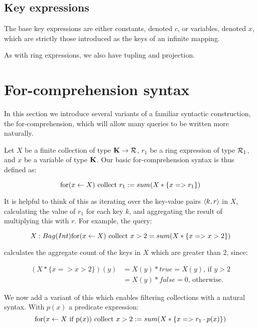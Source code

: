 {{{}

\subsection{Key expressions} {

The base key expressions are either constants, denoted $c$, or variables, denoted $x$, which are strictly those introduced as the keys of an infinite mapping.

As with ring expressions, we also have tupling and projection. 
}


\section{For-comprehension syntax} {
In this section we introduce several variants of a familiar syntactic construction, the for-comprehension, which will allow many queries to be written more naturally.

Let $X$ be a finite collection of type $\mathbf{K} \rightarrow \mathcal{R}$, $r_1$ be a ring expression of type $\mathcal{R}_1$, and $x$ be a variable of type $\mathbf{K}$. Our basic for-comprehension syntax is thus defined as:

\begin{equation*}
 \textrm{for}(x \leftarrow X) \textrm{ collect } r_1 := sum(X * \{x => r_1\})
 \end{equation*}
 
 It is helpful to think of this as iterating over the key-value pairs $\langle k, r \rangle$ in $X$, calculating the value of $r_1$ for each key $k$, and aggregating the result of multiplying this with $r$. For example, the query:

\begin{equation*} 
X : Bag(Int) \\
 \textrm{for}(x \leftarrow X) \textrm{ collect } x > 2 = sum(X * \{x => x > 2\})
\end{equation*}

calculates the aggregate count of the keys in $X$ which are greater than 2, since:

\begin{equation*}
\begin{split}
(X*\{x => x > 2\})(y) &= X(y)*true = X(y)\textrm{, if } y > 2 \\
 &= X(y)*false = 0\textrm{, otherwise.}
\end{split}
\end{equation*}

We now add a variant of this which enables filtering collections with a natural syntax. With $p(x)$ a predicate expression:
\begin{equation*}
 \textrm{for}(x \leftarrow X \textrm{ if p}(x)) \textrm{ collect } x > 2 := sum(X * \{x => r_1 \cdot p(x) \})
\end{equation*}

}}}
